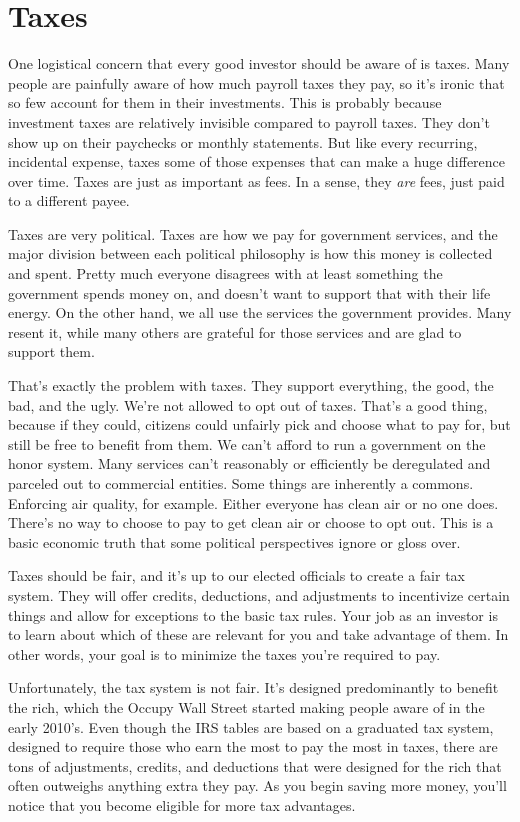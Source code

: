 \section{Taxes}
One logistical concern that every good investor should be aware of is taxes. Many people are painfully aware of how much payroll taxes they pay, so it's ironic that so few account for them in their investments. This is probably because investment taxes are relatively invisible compared to payroll taxes. They don't show up on their paychecks or monthly statements. But like every recurring, incidental expense, taxes some of those expenses that can make a huge difference over time. Taxes are just as important as fees. In a sense, they \emph{are} fees, just paid to a different payee.

Taxes are very political. Taxes are how we pay for government services, and the major division between each political philosophy is how this money is collected and spent. Pretty much everyone disagrees with at least something the government spends money on, and doesn't want to support that with their life energy. On the other hand, we all use the services the government provides. Many resent it, while many others are grateful for those services and are glad to support them.

That's exactly the problem with taxes. They support everything, the good, the bad, and the ugly. We're not allowed to opt out of taxes. That's a good thing, because if they could, citizens could unfairly pick and choose what to pay for, but still be free to benefit from them. We can't afford to run a government on the honor system. Many services can't reasonably or efficiently be deregulated and parceled out to commercial entities. Some things are inherently a commons. Enforcing air quality, for example. Either everyone has clean air or no one does. There's no way to choose to pay to get clean air or choose to opt out. This is a basic economic truth that some political perspectives ignore or gloss over.

Taxes should be fair, and it's up to our elected officials to create a fair tax system. They will offer credits, deductions, and adjustments to incentivize certain things and allow for exceptions to the basic tax rules. Your job as an investor is to learn about which of these are relevant for you and take advantage of them. In other words, your goal is to minimize the taxes you're required to pay.

Unfortunately, the tax system is not fair. It's designed predominantly to benefit the rich, which the Occupy Wall Street started making people aware of in the early 2010's. Even though the IRS tables are based on a graduated tax system, designed to require those who earn the most to pay the most in taxes, there are tons of adjustments, credits, and deductions that were designed for the rich that often outweighs anything extra they pay. As you begin saving more money, you'll notice that you become eligible for more tax advantages.

